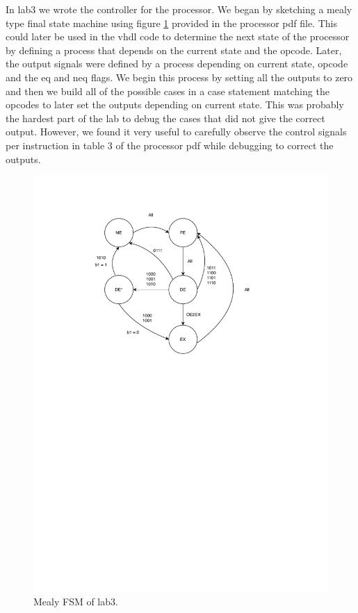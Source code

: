 


In lab3 we wrote the controller for the processor. We began by sketching a mealy
type final state machine using figure \ref{lab3_1:FSM} provided in the processor pdf file. This
could later be used in the vhdl code to determine the next state of the
processor by defining a process that depends on the current state and the opcode. 
Later, the output signals were defined by a process depending on current state,
opcode and the eq and neq flags. We begin this process by setting all the
outputs to zero and then we build all of the possible cases in a case statement
matching the opcodes to later set the outputs depending on current state. This
was probably the hardest part of the lab to debug the cases that did not give
the correct output. However, we found it very useful to carefully observe the
control signals per instruction in table 3 of the processor pdf while debugging
to correct the outputs. 

\begin{figure}[h]
    \caption{Mealy FSM of lab3.}
    \label{lab3_1:FSM}
    \centering
    \includegraphics[width=\textwidth]{fsm.pdf}
  \end{figure}


